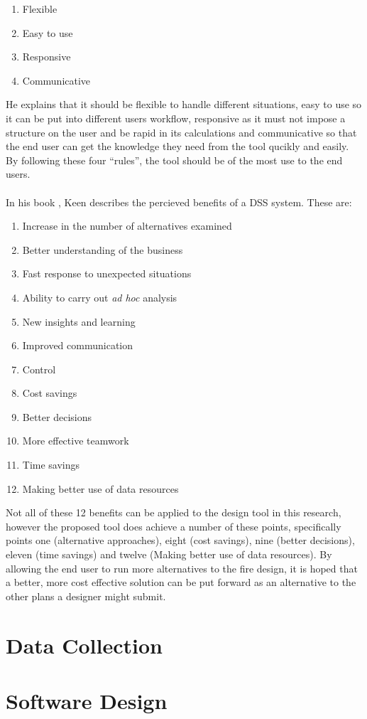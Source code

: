 \documentclass[table,a4paper,oneside]{book}
\begin{document}
\begin{enumerate}
\item Flexible
\item Easy to use
\item Responsive
\item Communicative
\end{enumerate}

He explains that it should be flexible to handle different situations, easy to use so it can be put into different users workflow, responsive as it must not impose a structure on the user and be rapid in its calculations and communicative so that the end user can get the knowledge they need from the tool qucikly and easily. By following these four ``rules'', the tool should be of the most use to the end users.
\\
\\
In his book \citep{Keen1980} , Keen describes the percieved benefits of a \ac{DSS} system. These are:

\begin{enumerate}
\item Increase in the number of alternatives examined
\item Better understanding of the business
\item Fast response to unexpected situations
\item Ability to carry out \emph{ad hoc} analysis
\item New insights and learning
\item Improved communication
\item Control
\item Cost savings
\item Better decisions
\item More effective teamwork
\item Time savings
\item Making better use of data resources
\end{enumerate}

Not all of these 12 benefits can be applied to the design tool in this research, however the proposed tool does achieve a number of these points, specifically points one (alternative approaches), eight (cost savings), nine (better decisions), eleven (time savings) and twelve (Making better use of data resources). By allowing the end user to run more alternatives to the fire design, it is hoped that a better, more cost effective solution can be put forward as an alternative to the other plans a designer might submit.

\section{Data Collection}
\label{sec:Data_Collection}

\section{Software Design}
\label{sec:Software_Design}




\end{document}
